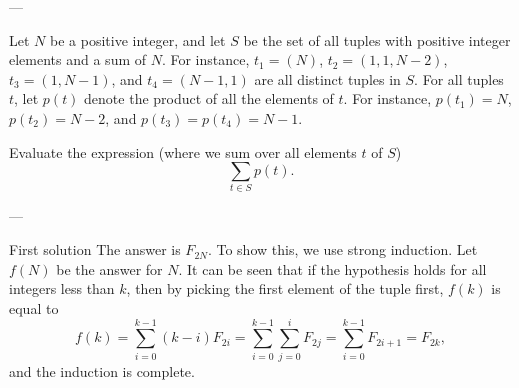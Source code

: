 
---

Let $N$ be a positive integer, and let $S$ be the set of all tuples with positive integer elements and a sum of $N$. For instance, $t_1=(N)$, $t_2=(1,1,N-2)$, $t_3=(1,N-1)$, and $t_4=(N-1,1)$ are all distinct tuples in $S$. For all tuples $t$, let $p(t)$ denote the product of all the elements of $t$. For instance, $p(t_1)=N$, $p(t_2)=N-2$, and $p(t_3)=p(t_4)=N-1$.

Evaluate the expression (where we sum over all elements $t$ of $S$) \[\sum_{t\in S}p(t).\]

---

\begin{customenv}{First solution}
    The answer is $F_{2N}$. To show this, we use strong induction. Let $f(N)$ be the answer for $N$. It can be seen that if the hypothesis holds for all integers less than $k$, then by picking the first element of the tuple first, $f(k)$ is equal to \[f(k)=\sum_{i=0}^{k-1} (k-i)F_{2i}=\sum_{i=0}^{k-1}\sum_{j=0}^i F_{2j}=\sum_{i=0}^{k-1} F_{2i+1}=F_{2k},\]
    and the induction is complete.
\end{customenv}
